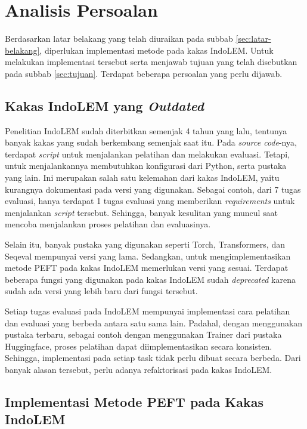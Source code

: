 \section{Analisis Persoalan}
\label{sec:analisis-persoalan}

Berdasarkan latar belakang yang telah diuraikan pada subbab \ref{sec:latar-belakang}, diperlukan implementasi metode \PEFT pada kakas IndoLEM. Untuk melakukan implementasi tersebut serta menjawab tujuan yang telah disebutkan pada subbab \ref{sec:tujuan}. Terdapat beberapa persoalan yang perlu dijawab.

\subsection{Kakas IndoLEM yang \textit{Outdated}}

Penelitian IndoLEM sudah diterbitkan semenjak 4 tahun yang lalu, tentunya banyak kakas yang sudah berkembang semenjak saat itu. Pada \textit{source code}-nya, terdapat \textit{script} untuk menjalankan pelatihan dan melakukan evaluasi. Tetapi, untuk menjalankannya membutuhkan konfigurasi dari Python, serta pustaka yang lain. Ini merupakan salah satu kelemahan dari kakas IndoLEM, yaitu kurangnya dokumentasi pada versi yang digunakan. Sebagai contoh, dari 7 tugas evaluasi, hanya terdapat 1 tugas evaluasi yang memberikan \textit{requirements} untuk menjalankan \textit{script} tersebut. Sehingga, banyak kesulitan yang muncul saat mencoba menjalankan proses pelatihan dan evaluasinya.

Selain itu, banyak pustaka yang digunakan seperti Torch, Transformers, dan Seqeval mempunyai versi yang lama. Sedangkan, untuk mengimplementasikan metode PEFT pada kakas IndoLEM memerlukan versi yang sesuai. Terdapat beberapa fungsi yang digunakan pada kakas IndoLEM sudah \textit{deprecated} karena sudah ada versi yang lebih baru dari fungsi tersebut.

Setiap tugas evaluasi pada IndoLEM mempunyai implementasi cara pelatihan dan evaluasi yang berbeda antara satu sama lain. Padahal, dengan menggunakan pustaka terbaru, sebagai contoh dengan menggunakan Trainer dari pustaka Huggingface, proses pelatihan dapat diimplementasikan secara konsisten. Sehingga, implementasi pada setiap task tidak perlu dibuat secara berbeda. Dari banyak alasan tersebut, perlu adanya refaktorisasi pada kakas IndoLEM.

\subsection{Implementasi Metode PEFT pada Kakas IndoLEM}

